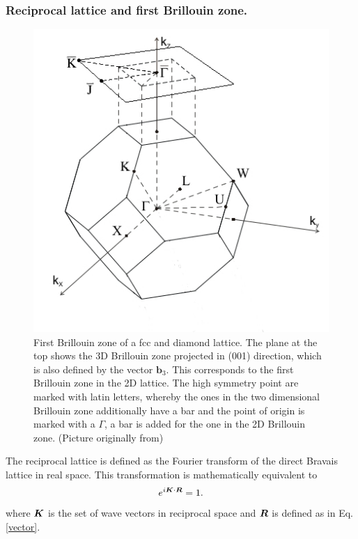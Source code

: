 	\subsubsection{Reciprocal lattice and first Brillouin zone.} \label{Brillouin_zone}
	\begin{figure}[t!]
		\centering
		\includegraphics[width=.5\linewidth]{andere_bilder/brillouin_zone_001_2.jpg}
		\caption{First Brillouin zone of a fcc and diamond lattice. 
		The plane at the top shows the 3D Brillouin zone projected in (001) direction, which is also defined by the vector $\boldsymbol{b}_3$. This corresponds to the first Brillouin zone in the 2D lattice. The high symmetry point are marked with latin letters, whereby the ones in the two dimensional Brillouin zone additionally have a bar and the point of origin is marked with a $\Gamma$, a bar is added for the one in the 2D Brillouin zone.  
		(Picture originally from\cite{aluminium})}\label{brillouin_zone}
	\end{figure}
		The reciprocal lattice is defined as the Fourier transform of the direct Bravais lattice in real space. This transformation is mathematically equivalent to
		\begin{equation} \label{exp}
		e^{i \boldsymbol{K} \cdot \boldsymbol{R}} = 1.
		\end{equation}
		where $\boldsymbol{K}$ is the set of wave vectors in reciprocal space and $\boldsymbol{R}$ is defined as in Eq. \ref{vector}.
